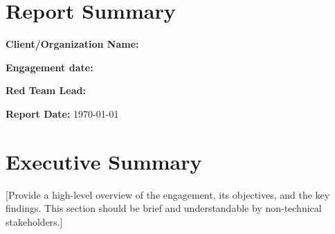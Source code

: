 \section{Report Summary}
\makeatletter
\textbf{Client/Organization Name:}

\textbf{Engagement date:}

\textbf{Red Team Lead:}

\textbf{Report Date:} \today


\section{Executive Summary}
[Provide a high-level overview of the engagement, its objectives, and the key findings. This section should be brief and understandable by non-technical stakeholders.]

